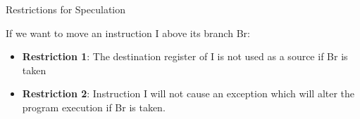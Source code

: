 \documentclass[presentation]{beamer}
\begin{document}
\begin{frame}{Restrictions for Speculation}
    \begin{center}
        \begin{minipage}{0.45\textwidth}
            \centering
            
        \end{minipage}
        \hfill
        \begin{minipage}{0.45\textwidth}
            \centering
            
        \end{minipage}
    \end{center}
    \vspace{-0.9cm}
    \begin{center}
        \captionsetup{type=Listing}
        \label{fig:restrictions_speculation}
    \end{center}
        \vspace{-1cm}
    \begin{block}{If we want to move an instruction I above its branch Br:}
        \begin{itemize}
            \item \textbf{Restriction 1}: The destination register of I is not used as a source if Br is taken
            \item \textbf{Restriction 2}: Instruction I will not cause an exception which will alter the program
execution if Br is taken.
        \end{itemize}
    \end{block}
\end{frame}
\end{document}
